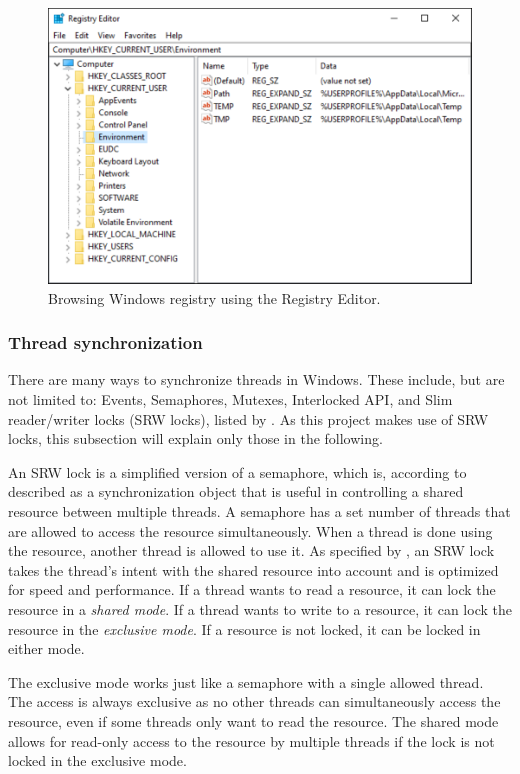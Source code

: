 \begin{figure}[hbt]
	\centering
	\includegraphics[width=\columnwidth]{obrazky-figures/regedit.pdf}
	\caption{Browsing Windows registry using the Registry Editor.}
	\label{winRegedit}
\end{figure}

\subsubsection{Thread synchronization}
There are many ways to synchronize threads in Windows. These include, but are not limited to: Events, Semaphores, Mutexes, Interlocked API, and Slim reader/writer locks (SRW locks), listed by \cite{WinSyncFuncs}. As this project makes use of SRW locks, this subsection will explain only those in the following.

An SRW lock is a simplified version of a semaphore, which is, according to \cite{WinSemaphores} described as a synchronization object that is useful in controlling a shared resource between multiple threads. A semaphore has a set number of threads that are allowed to access the resource simultaneously. When a thread is done using the resource, another thread is allowed to use it. As specified by \cite{WinSRW}, an SRW lock takes the thread's intent with the shared resource into account and is optimized for speed and performance. If a thread wants to read a resource, it can lock the resource in a \textit{shared mode}. If a thread wants to write to a resource, it can lock the resource in the \textit{exclusive mode}. If a resource is not locked, it can be locked in either mode. 

The exclusive mode works just like a semaphore with a single allowed thread. The access is always exclusive as no other threads can simultaneously access the resource, even if some threads only want to read the resource.
The shared mode allows for read-only access to the resource by multiple threads if the lock is not locked in the exclusive mode.

